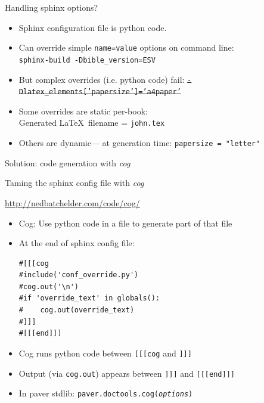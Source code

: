 \documentclass{beamer}
\begin{document}
\begin{frame}[fragile]{Handling sphinx options?}

\begin{itemize}
\item Sphinx configuration file is python code.

\item Can override simple \texttt{name=value} options on command line:\\
\texttt{sphinx-build -Dbible\_version=ESV}

\item But complex overrides (i.e. python code) fail:
\sout{\texttt{-Dlatex\_elements['papersize']='a4paper'}}

\item Some overrides are static per-book:\\
Generated \LaTeX\ filename = \texttt{john.tex}

\item Others are dynamic--- at generation time:
\texttt{papersize = "letter"}
\end{itemize}

Solution: code generation with \emph{cog}
\end{frame}

\begin{frame}[fragile]{Taming the sphinx config file with \emph{cog}}

\url{http://nedbatchelder.com/code/cog/}

\begin{itemize}
\item Cog: Use python code in a file to generate part of that file

\item At the end of sphinx config file:
\begin{verbatim}
#[[[cog 
#include('conf_override.py')
#cog.out('\n')
#if 'override_text' in globals():
#    cog.out(override_text)
#]]]
#[[[end]]]
\end{verbatim}

\item Cog runs python code between \texttt{[[[cog} and \texttt{]]]}

\item Output (via \texttt{cog.out}) appears between \texttt{]]]} and \texttt{[[[end]]]}

\item In paver stdlib: \texttt{paver.doctools.cog(\emph{options})}
\end{itemize}
\end{frame}
\end{document}
